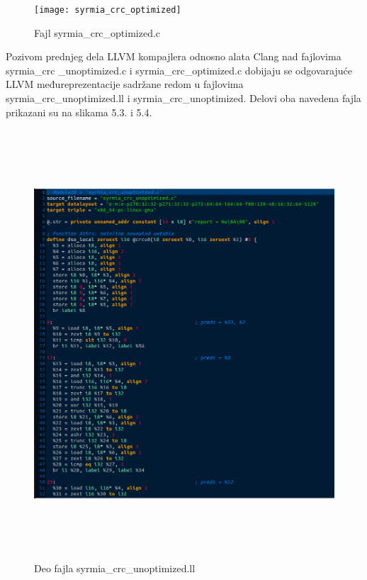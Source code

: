 \documentclass[12pt,oneside]{memoir}
\begin{document}
%
\begin{figure}
\texttt{[image: syrmia\_crc\_optimized]}
\caption{Fajl syrmia\_crc\_optimized.c}
\centering
\end{figure}

Pozivom prednjeg dela LLVM kompajlera odnosno alata Clang nad fajlovima syrmia\_crc
\_unoptimized.c i syrmia\_crc\_optimized.c dobijaju se odgovarajuće LLVM međureprezentacije 
sadržane redom u fajlovima syrmia_crc_unoptimized.ll i syrmia_crc_unoptimized. Delovi oba 
navedena fajla prikazani su na slikama 5.3. i 5.4.

\begin{figure}
\includegraphics[width=\textwidth, height=16cm]{unoptimized_ir}
\caption{Deo fajla syrmia\_crc\_unoptimized.ll}
\centering
\end{figure}
\end{document}
